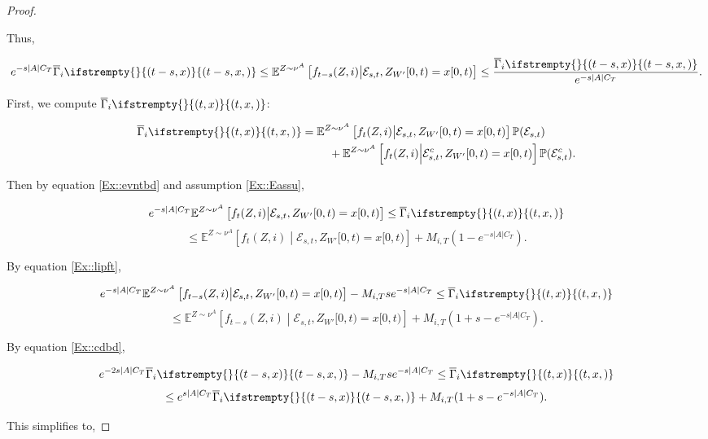 \documentclass[12pt]{article}
\newcommand{\mb}{\mathbb}
\newcommand{\mc}{\mathcal}
\newcommand{\ov}{\overline}
\newcommand{\pr}{\mb{P}}							%
\newcommand{\exmu}[2]{\mb{E}^{#1}\left[#2\right]}	%
\newcommand{\xf}{x}									%
\newcommand{\vind}[1]{_{#1}}						%
\newcommand{\tmi}[1]{#1}							%
\newcommand{\vpara}[1]{^{#1}}						%
\newcommand{\stpara}[1]{_{#1}}						%
\newcommand{\tpara}[1]{_{#1}}						%
\newcommand{\jumpbd}[1]{C_{#1}}						%
\newcommand{\tmepro}[3]{
\ifstrempty{#3}{
	\left(#1,#2\right)}{
	\left(#1,#2,#3\right)}}							%
\newcommand{\evnt}{\mc{E}}						%
\newcommand{\ratee}{\Gamma}							%
\newcommand{\grate}{\ov{\ratee}}					%
\newcommand{\mm}{\nu}								%
\newcommand{\const}{M}								%
\newcommand{\sttpara}[2]{_{#1,#2}}					%
\newcommand{\tspara}[2]{_{#1,#2}}					%
\newcommand{\Xh}{Z}									%
\begin{document}
\begin{proof}
\begin{itemize}
Thus,

\begin{equation}
e^{-s|A|\jumpbd{T}}\grate\stpara{i}\tmepro{t-s}{\xf}{} \leq \exmu{\Xh \sim\mm\vpara{A}}{f\tpara{t-s}(\Xh,i)\middle|\evnt\tspara{s}{t},\Xh\vind{W'}\tmi{[0,t)} = \xf\tmi{[0,t)}} \leq \frac{\grate\stpara{i}\tmepro{t-s}{\xf}{}}{e^{-s|A|\jumpbd{T}}}.
\label{Ex::cdbd}
\end{equation}
\end{itemize}

First, we compute \(\grate\stpara{i}\tmepro{t}{\xf}{}\):

\begin{align*}
\grate\stpara{i}\tmepro{t}{\xf}{} &= \exmu{\Xh \sim\mm\vpara{A}}{f\tpara{t}(\Xh,i)\middle|\evnt\tspara{s}{t},\Xh\vind{W'}\tmi{[0,t)} = \xf\tmi{[0,t)}}\pr(\evnt\tspara{s}{t})\\
&\hspace{24 pt} + \exmu{\Xh \sim\mm\vpara{A}}{f\tpara{t}(\Xh,i)\middle|\evnt\tspara{s}{t}^c,\Xh\vind{W'}\tmi{[0,t)} = \xf\tmi{[0,t)}}\pr(\evnt\tspara{s}{t}^c).
\end{align*}

Then by equation \eqref{Ex::evntbd} and assumption \ref{Ex::Eassu},

\[e^{-s|A|\jumpbd{T}}\exmu{\Xh \sim\mm\vpara{A}}{f\tpara{t}(\Xh,i)\middle|\evnt\tspara{s}{t},\Xh\vind{W'}\tmi{[0,t)} = \xf\tmi{[0,t)}} \leq \grate\stpara{i}\tmepro{t}{\xf}{}\]
\[\leq \exmu{\Xh \sim\mm\vpara{A}}{f\tpara{t}(\Xh,i)\middle|\evnt\tspara{s}{t},\Xh\vind{W'}\tmi{[0,t)} = \xf\tmi{[0,t)}} + \const\sttpara{i}{T}(1 - e^{-s|A|\jumpbd{T}}).\]

By equation \eqref{Ex::lipft},

\[e^{-s|A|\jumpbd{T}}\exmu{\Xh \sim\mm\vpara{A}}{f\tpara{t-s}(\Xh,i)\middle|\evnt\tspara{s}{t},\Xh\vind{W'}\tmi{[0,t)} = \xf\tmi{[0,t)}} - \const\sttpara{i}{T}se^{-s|A|\jumpbd{T}} \leq \grate\stpara{i}\tmepro{t}{\xf}{}\]
\[\leq \exmu{\Xh \sim\mm\vpara{A}}{f\tpara{t-s}(\Xh,i)\middle|\evnt\tspara{s}{t},\Xh\vind{W'}\tmi{[0,t)} = \xf\tmi{[0,t)}} + \const\sttpara{i}{T}(1 + s - e^{-s|A|\jumpbd{T}}).\]

By equation \eqref{Ex::cdbd},

\[e^{-2s|A|\jumpbd{T}}\grate\stpara{i}\tmepro{t-s}{\xf}{} - \const\sttpara{i}{T}se^{-s|A|\jumpbd{T}} \leq \grate\stpara{i}\tmepro{t}{\xf}{}\]
\[\leq e^{s|A|\jumpbd{T}}\grate\stpara{i}\tmepro{t-s}{\xf}{}+ \const\sttpara{i}{T}(1 + s - e^{-s|A|\jumpbd{T}}).\]

This simplifies to,


\end{proof}
\end{document}
